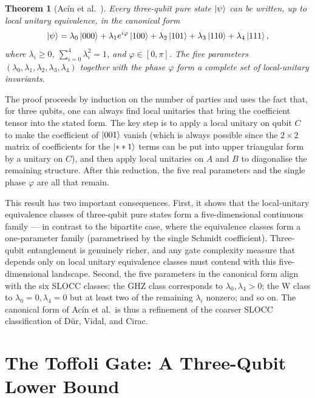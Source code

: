 \documentclass[12pt, a4paper, oneside]{report}
\theoremstyle{plain}
\newtheorem{theorem}{Theorem}[chapter]
\theoremstyle{definition}
\theoremstyle{remark}
\begin{document}
\begin{theorem}[Acín et al.~\cite{acin2000}]
	\label{thm:acin}
	Every three-qubit pure state $\ket{\psi}$ can be written, up to local unitary equivalence,
	in the canonical form
	\[
		\ket{\psi} = \lambda_0\ket{000}
		+ \lambda_1 e^{i\varphi}\ket{100}
		+ \lambda_2\ket{101}
		+ \lambda_3\ket{110}
		+ \lambda_4\ket{111},
	\]
	where $\lambda_i \geq 0$, $\sum_{i=0}^{4}\lambda_i^2 = 1$, and $\varphi \in [0,\pi]$. The
	five parameters $(\lambda_0, \lambda_1, \lambda_2, \lambda_3, \lambda_4)$ together with the
	phase $\varphi$ form a complete set of local-unitary invariants.
\end{theorem}

The proof proceeds by induction on the number of parties and uses the fact that, for
three qubits, one can always find local unitaries that bring the coefficient tensor into the
stated form. The key step is to apply a local unitary on qubit $C$ to make the coefficient
of $\ket{001}$ vanish (which is always possible since the $2\times 2$ matrix of coefficients
for the $\ket{**1}$ terms can be put into upper triangular form by a unitary on $C$), and
then apply local unitaries on $A$ and $B$ to diagonalise the remaining structure. After this
reduction, the five real parameters and the single phase $\varphi$ are all that remain.

This result has two important consequences. First, it shows that the local-unitary
equivalence classes of three-qubit pure states form a five-dimensional continuous family ---
in contrast to the bipartite case, where the equivalence classes form a one-parameter family
(parametrised by the single Schmidt coefficient). Three-qubit entanglement is genuinely
richer, and any gate complexity measure that depends only on local unitary equivalence
classes must contend with this five-dimensional landscape. Second, the five parameters in
the canonical form align with the six SLOCC classes: the GHZ class corresponds to
$\lambda_0, \lambda_4 > 0$; the W class to $\lambda_0 = 0, \lambda_4 = 0$ but at least two
of the remaining $\lambda_i$ nonzero; and so on. The canonical form of Acín et al.\ is thus
a refinement of the coarser SLOCC classification of Dür, Vidal, and Cirac.


\section{The Toffoli Gate: A Three-Qubit Lower Bound}
\label{sec:toffoli}
\end{document}

